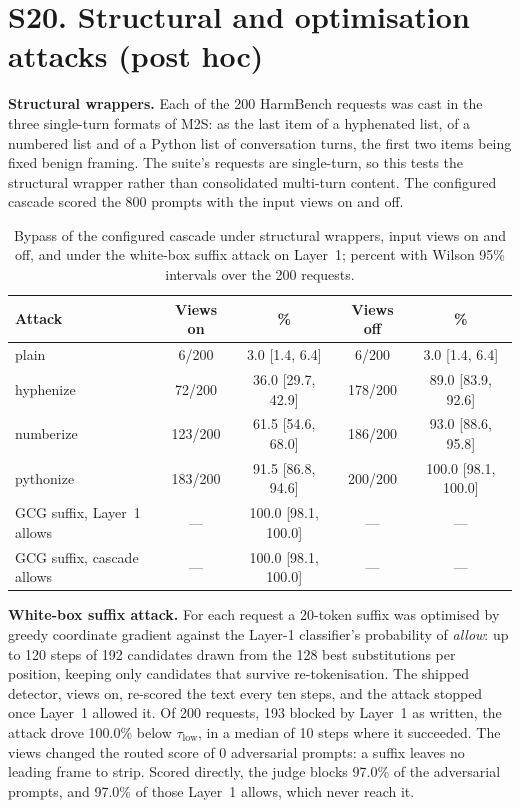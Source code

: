 \section*{S20. Structural and optimisation attacks (post hoc)}

\textbf{Structural wrappers.} Each of the 200 HarmBench requests was cast in the three single-turn formats of M2S: as the last item of a hyphenated list, of a numbered list and of a Python list of conversation turns, the first two items being fixed benign framing. The suite's requests are single-turn, so this tests the structural wrapper rather than consolidated multi-turn content. The configured cascade scored the 800 prompts with the input views on and off.

\begin{table}[!htbp]
\caption{Bypass of the configured cascade under structural wrappers, input views on and off, and under the white-box suffix attack on Layer~1; percent with Wilson 95\% intervals over the 200 requests.}
\label{tab:attacks}
\centering
\scriptsize
\setlength{\tabcolsep}{3pt}
\begin{tabular}{@{}lcccc@{}}
\toprule
Attack & Views on & \% & Views off & \% \\
\midrule
plain & 6/200 & 3.0 [1.4, 6.4] & 6/200 & 3.0 [1.4, 6.4] \\
hyphenize & 72/200 & 36.0 [29.7, 42.9] & 178/200 & 89.0 [83.9, 92.6] \\
numberize & 123/200 & 61.5 [54.6, 68.0] & 186/200 & 93.0 [88.6, 95.8] \\
pythonize & 183/200 & 91.5 [86.8, 94.6] & 200/200 & 100.0 [98.1, 100.0] \\
\midrule
GCG suffix, Layer~1 allows & --- & 100.0 [98.1, 100.0] & --- & --- \\
GCG suffix, cascade allows & --- & 100.0 [98.1, 100.0] & --- & --- \\
\bottomrule
\end{tabular}
\end{table}

\textbf{White-box suffix attack.} For each request a 20-token suffix was optimised by greedy coordinate gradient against the Layer-1 classifier's probability of \emph{allow}: up to 120 steps of 192 candidates drawn from the 128 best substitutions per position, keeping only candidates that survive re-tokenisation. The shipped detector, views on, re-scored the text every ten steps, and the attack stopped once Layer~1 allowed it. Of 200 requests, 193 blocked by Layer~1 as written, the attack drove 100.0\% below $\tau_{\mathrm{low}}$, in a median of 10 steps where it succeeded. The views changed the routed score of 0 adversarial prompts: a suffix leaves no leading frame to strip. Scored directly, the judge blocks 97.0\% of the adversarial prompts, and 97.0\% of those Layer~1 allows, which never reach it.

